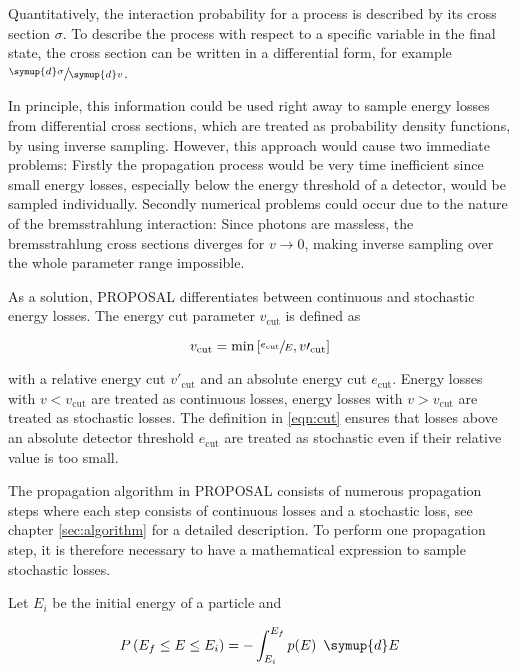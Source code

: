 Quantitatively, the interaction probability for a process is described by its cross section $\sigma$.
To describe the process with respect to a specific variable in the final state, the cross section can be written in a differential form, for example $\sfrac{\symup{d}\sigma}{\symup{d}v}$.

In principle, this information could be used right away to sample energy losses from differential cross sections, which are treated as probability density functions, by using inverse sampling.
However, this approach would cause two immediate problems:
Firstly the propagation process would be very time inefficient since small energy losses, especially below the energy threshold of a detector, would be sampled individually.
Secondly numerical problems could occur due to the nature of the bremsstrahlung interaction:
Since photons are massless, the bremsstrahlung cross sections diverges for $v \to 0$, making inverse sampling over the whole parameter range impossible.

As a solution, PROPOSAL differentiates between continuous and stochastic energy losses.
The energy cut parameter $v_\text{cut}$ is defined as

\begin{equation}
	\label{eqn:cut}
	v_\text{cut} = \text{min}\left[\sfrac{e_\text{cut}}{E}, v\prime_\text{cut} \right]
\end{equation}

with a relative energy cut $v\prime_\text{cut}$ and an absolute energy cut $e_\text{cut}$.
Energy losses with $v < v_\text{cut}$ are treated as continuous losses, energy losses with $v > v_\text{cut}$ are treated as stochastic losses.
The definition in \eqref{eqn:cut} ensures that losses above an absolute detector threshold $e_\text{cut}$ are treated as stochastic even if their relative value is too small.

The propagation algorithm in PROPOSAL consists of numerous propagation steps where each step consists of continuous losses and a stochastic loss, see chapter \ref{sec:algorithm} for a detailed description.
To perform one propagation step, it is therefore necessary to have a mathematical expression to sample stochastic losses.

Let $E_i$ be the initial energy of a particle and

\begin{equation}
	\label{eqn:cum}
	P\left(E_f \leq E \leq E_i\right) = - \int_{E_i}^{E_f} p(E) \, \symup{d}E
\end{equation}

